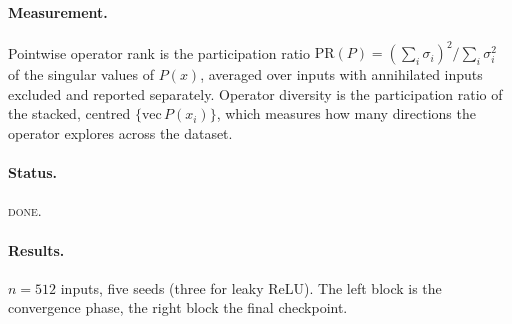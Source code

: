 \documentclass{article} %
\theoremstyle{plain}
\theoremstyle{definition}
\theoremstyle{remark}
\begin{document}
\paragraph{Measurement.}
Pointwise operator rank is the participation ratio
$\mathrm{PR}(P) = (\sum_i \sigma_i)^2 / \sum_i \sigma_i^2$ of the singular values of $P(x)$,
averaged over inputs with annihilated inputs excluded and reported separately. Operator diversity is
the participation ratio of the stacked, centred $\{\mathrm{vec}\,P(x_i)\}$, which measures how many
directions the operator explores across the dataset.

\paragraph{Status.} \textsc{done}.

\paragraph{Results.}
$n = 512$ inputs, five seeds (three for leaky ReLU). The left block is the convergence phase, the
right block the final checkpoint.
\end{document}
